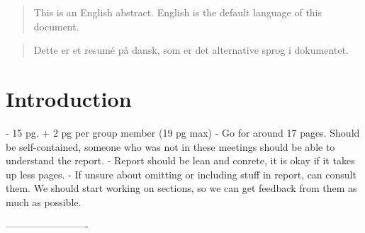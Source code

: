 \documentclass{ituthesis}
\begin{document}

\frontmatter

\thetitlepage
\newpage

\begin{abstract}
This is an English abstract. English is the default language of this document.
\end{abstract}

\begin{otherlanguage}{danish}
  \begin{abstract}
    Dette er et resumé på dansk, som er det alternative sprog i dokumentet.
  \end{abstract}
\end{otherlanguage}

\cleardoublepage
\setcounter{tocdepth}{1}
\tableofcontents

\mainmatter

\midsloppy
\sloppybottom

\chapter{Introduction}
	- 15 pg. + 2 pg per group member (19 pg max)
	- Go for around 17 pages. Should be self-contained, someone who was not in these meetings should be able to understand the report. 
	- Report should be lean and conrete, it is okay if it takes up less pages.
	- If unsure about omitting or including stuff in report, can consult them.
We should start working on sections, so we can get feedback from them as much as possible.

-------------------------
\end{document}
